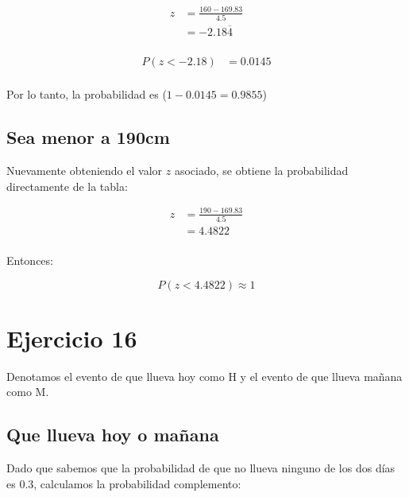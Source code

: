\documentclass[letterpaper,12pt]{memoir}
\theoremstyle{definition}
\begin{document}
\begin{equation*}
  \begin{split}
  z &= \frac{160 - 169.83}{4.5}\\
  &= -2.18\overline{4}\\
  \end{split}
\end{equation*}

\begin{equation*}
  \begin{split}
  P(z < -2.18)&= 0.0145\\
  \end{split}
\end{equation*}

Por lo tanto, la probabilidad es (\(1 - 0.0145 = 0.9855\))

\subsection*{Sea menor a 190cm}

Nuevamente obteniendo el valor \(z\) asociado, se obtiene la probabilidad directamente de la tabla:


\begin{equation*}
  \begin{split}
  z &= \frac{190 - 169.83}{4.5}\\
  &= 4.4822\\
  \end{split}
\end{equation*}

Entonces:

\begin{equation*}
  P(z < 4.4822) \approx 1
\end{equation*}



\section*{Ejercicio 16}

Denotamos el evento de que llueva hoy como H y el evento de que llueva mañana como M.

\subsection*{Que llueva hoy o mañana}

Dado que sabemos que la probabilidad de que no llueva ninguno de los dos días es 0.3, calculamos la probabilidad complemento:
\end{document}

